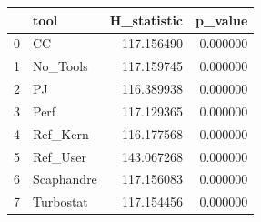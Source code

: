 \begin{tabular}{llrr}
\toprule
 & tool & H_statistic & p_value \\
\midrule
0 & CC & 117.156490 & 0.000000 \\
1 & No_Tools & 117.159745 & 0.000000 \\
2 & PJ & 116.389938 & 0.000000 \\
3 & Perf & 117.129365 & 0.000000 \\
4 & Ref_Kern & 116.177568 & 0.000000 \\
5 & Ref_User & 143.067268 & 0.000000 \\
6 & Scaphandre & 117.156083 & 0.000000 \\
7 & Turbostat & 117.154456 & 0.000000 \\
\bottomrule
\end{tabular}
